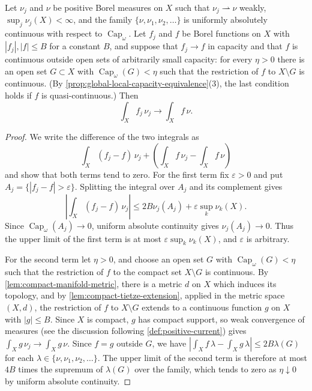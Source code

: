 \begin{lemma}\label{lem:global-capacity-weighted-measure-convergence}
Let $\nu_j$ and $\nu$ be positive Borel measures on $X$ such that $\nu_j\rightharpoonup\nu$ weakly, $\sup_j\nu_j(X)<\infty$, and the family $\{\nu,\nu_1,\nu_2,\ldots\}$ is uniformly absolutely continuous with respect to $\operatorname{Cap}_\omega$. Let $f_j$ and $f$ be Borel functions on $X$ with $|f_j|,|f|\leq B$ for a constant $B$, and suppose that $f_j\to f$ in capacity and that $f$ is continuous outside open sets of arbitrarily small capacity: for every $\eta>0$ there is an open set $G\subset X$ with $\operatorname{Cap}_\omega(G)<\eta$ such that the restriction of $f$ to $X\setminus G$ is continuous. (By \cref{prop:global-local-capacity-equivalence}(3), the last condition holds if $f$ is quasi-continuous.) Then
\[
 \int_Xf_j\,\nu_j\longrightarrow\int_Xf\,\nu.
\]
\end{lemma}
\begin{proof}
We write the difference of the two integrals as
\[
 \int_X(f_j-f)\,\nu_j+\left(\int_Xf\,\nu_j-\int_Xf\,\nu\right)
\]
and show that both terms tend to zero. For the first term fix $\varepsilon>0$ and put $A_j=\{|f_j-f|>\varepsilon\}$. Splitting the integral over $A_j$ and its complement gives
\[
 \left|\int_X(f_j-f)\,\nu_j\right|\leq2B\nu_j(A_j)+\varepsilon\sup_k\nu_k(X).
\]
Since $\operatorname{Cap}_\omega(A_j)\to0$, uniform absolute continuity gives $\nu_j(A_j)\to0$. Thus the upper limit of the first term is at most $\varepsilon\sup_k\nu_k(X)$, and $\varepsilon$ is arbitrary.

For the second term let $\eta>0$, and choose an open set $G$ with $\operatorname{Cap}_\omega(G)<\eta$ such that the restriction of $f$ to the compact set $X\setminus G$ is continuous. By \cref{lem:compact-manifold-metric}, there is a metric $d$ on $X$ which induces its topology, and by \cref{lem:compact-tietze-extension}, applied in the metric space $(X,d)$, the restriction of $f$ to $X\setminus G$ extends to a continuous function $g$ on $X$ with $|g|\leq B$. Since $X$ is compact, $g$ has compact support, so weak convergence of measures (see the discussion following \cref{def:positive-current}) gives $\int_Xg\,\nu_j\to\int_Xg\,\nu$. Since $f=g$ outside $G$, we have $|\int_Xf\,\lambda-\int_Xg\,\lambda|\leq2B\lambda(G)$ for each $\lambda\in\{\nu,\nu_1,\nu_2,\ldots\}$. The upper limit of the second term is therefore at most $4B$ times the supremum of $\lambda(G)$ over the family, which tends to zero as $\eta\downarrow0$ by uniform absolute continuity.
\end{proof}

